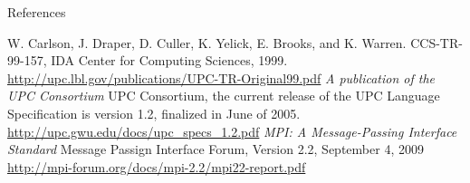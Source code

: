 \documentclass[final]{beamer}
\begin{document}
\begin{frame}[t]
\begin{columns}[t]
\begin{column}{0.28\paperwidth}
\begin{block}{References}
\begin{thebibliography}{7}
{							W. Carlson, J. Draper, D. Culler, K. Yelick, E. Brooks, and K. Warren. CCS-TR-99-157, IDA Center for Computing Sciences, 1999.
						  \url{http://upc.lbl.gov/publications/UPC-TR-Original99.pdf}
							\emph{A publication of the UPC Consortium}
							UPC Consortium, the current release of the UPC Language Specification is version 1.2, finalized in June of 2005.
							\url{http://upc.gwu.edu/docs/upc_specs_1.2.pdf}
							\emph{MPI: A Message-Passing Interface Standard} Message Passign Interface Forum, Version 2.2, September 4, 2009 
							\url{http://mpi-forum.org/docs/mpi-2.2/mpi22-report.pdf}
						}
					\end{thebibliography}
				\end{block}
			\end{column}
		\end{columns}
	\end{frame}
\end{document}

